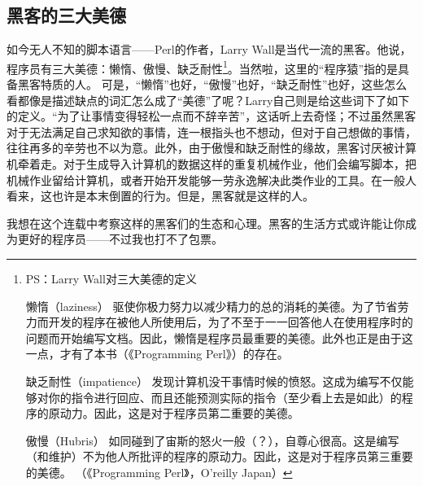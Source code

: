 \documentclass[a4paper,12pt]{article}
\begin{document}
\subsection{黑客的三大美德}
如今无人不知的脚本语言——Perl的作者，Larry Wall是当代一流的黑客。他说，程序员有三大美德：懒惰、傲慢、缺乏耐性\footnote{PS：Larry Wall对三大美德的定义

懒惰（laziness）
驱使你极力努力以减少精力的总的消耗的美德。为了节省劳力而开发的程序在被他人所使用后，为了不至于一一回答他人在使用程序时的问题而开始编写文档。因此，懒惰是程序员最重要的美德。此外也正是由于这一点，才有了本书（《Programming Perl》）的存在。

缺乏耐性（impatience）
发现计算机没干事情时候的愤怒。这成为编写不仅能够对你的指令进行回应、而且还能预测实际的指令（至少看上去是如此）的程序的原动力。因此，这是对于程序员第二重要的美德。

傲慢（Hubris）
如同碰到了宙斯的怒火一般（？），自尊心很高。这是编写（和维护）不为他人所批评的程序的原动力。因此，这是对于程序员第三重要的美德。
（《Programming Perl》，O'reilly Japan）}。当然啦，这里的“程序猿”指的是具备黑客特质的人。
可是，“懒惰”也好，“傲慢”也好，“缺乏耐性”也好，这些怎么看都像是描述缺点的词汇怎么成了“美德”了呢？Larry自己则是给这些词下了如下的定义。“为了让事情变得轻松一点而不辞辛苦”，这话听上去奇怪；不过虽然黑客对于无法满足自己求知欲的事情，连一根指头也不想动，但对于自己想做的事情，往往再多的辛劳也不以为意。此外，由于傲慢和缺乏耐性的缘故，黑客讨厌被计算机牵着走。对于生成导入计算机的数据这样的重复机械作业，他们会编写脚本，把机械作业留给计算机，或者开始开发能够一劳永逸解决此类作业的工具。在一般人看来，这也许是本末倒置的行为。但是，黑客就是这样的人。

我想在这个连载中考察这样的黑客们的生态和心理。黑客的生活方式或许能让你成为更好的程序员——不过我也打不了包票。
\end{document}

